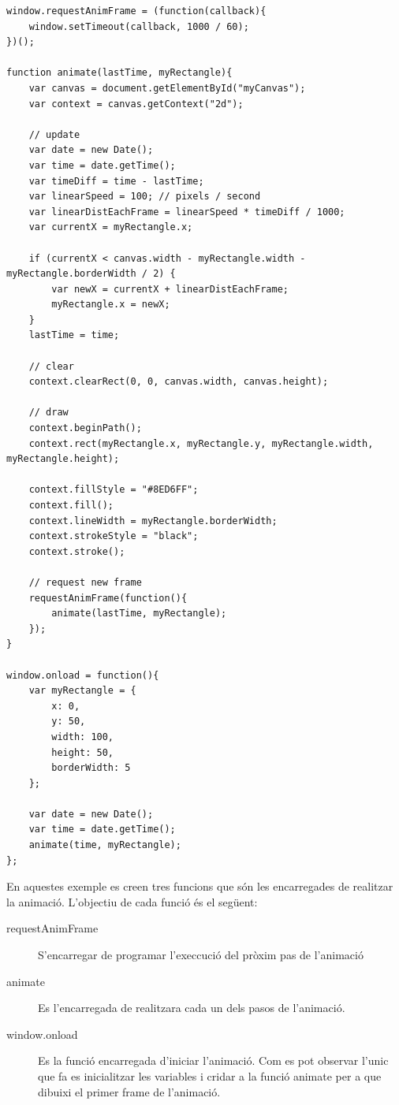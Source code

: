 \begin{lstlisting}
window.requestAnimFrame = (function(callback){
    window.setTimeout(callback, 1000 / 60);
})();
 
function animate(lastTime, myRectangle){
    var canvas = document.getElementById("myCanvas");
    var context = canvas.getContext("2d");
 
    // update
    var date = new Date();
    var time = date.getTime();
    var timeDiff = time - lastTime;
    var linearSpeed = 100; // pixels / second
    var linearDistEachFrame = linearSpeed * timeDiff / 1000;
    var currentX = myRectangle.x;
 
    if (currentX < canvas.width - myRectangle.width - myRectangle.borderWidth / 2) {
        var newX = currentX + linearDistEachFrame;
        myRectangle.x = newX;
    }
    lastTime = time;
 
    // clear
    context.clearRect(0, 0, canvas.width, canvas.height);
 
    // draw
    context.beginPath();
    context.rect(myRectangle.x, myRectangle.y, myRectangle.width, myRectangle.height);
 
    context.fillStyle = "#8ED6FF";
    context.fill();
    context.lineWidth = myRectangle.borderWidth;
    context.strokeStyle = "black";
    context.stroke();
 
    // request new frame
    requestAnimFrame(function(){
        animate(lastTime, myRectangle);
    });
}
 
window.onload = function(){
    var myRectangle = {
        x: 0,
        y: 50,
        width: 100,
        height: 50,
        borderWidth: 5
    };
 
    var date = new Date();
    var time = date.getTime();
    animate(time, myRectangle);
};
\end{lstlisting}

En aquestes exemple es creen tres funcions que són les encarregades de realitzar la animació. L'objectiu de cada funció és el següent:

\begin{description}
    \item[requestAnimFrame]{ S'encarregar de programar l'execcució del pròxim pas de l'animació}
    \item[animate]{ Es l'encarregada de realitzara cada un dels pasos de l'animació.}
    \item[window.onload] { Es la funció encarregada d'iniciar l'animació. Com es pot observar l'unic que fa es inicialitzar les variables i cridar a la funció animate per a que dibuixi el primer frame de l'animació.}
\end{description}

